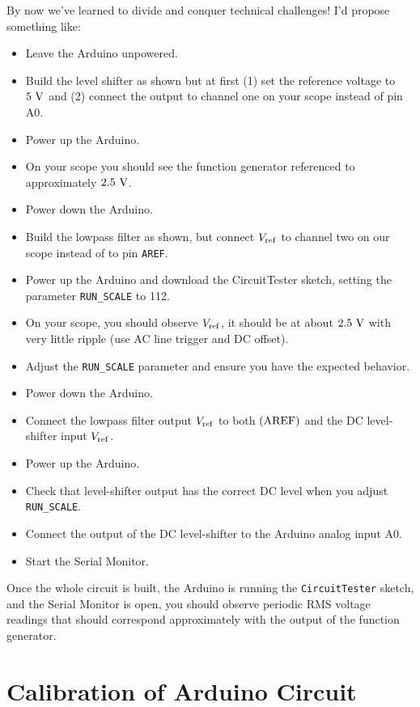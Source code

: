 \documentclass[12pt]{article}
\begin{document}
By now we've learned to divide and conquer technical challenges!  I'd propose something like:
\begin{itemize}
\item Leave the Arduino unpowered.
\item Build the level shifter as shown but at first (1) set the reference voltage to $5~\rm V$ and (2) connect the output to channel one on your scope instead of pin A0.
\item Power up the Arduino.
\item On your scope you should see the function generator referenced to approximately $2.5~\rm V$.
\item Power down the Arduino.
\item Build the lowpass filter as shown, but  connect $V_{\rm ref}$ to channel two on our scope instead of to pin {\tt AREF}.
\item Power up the Arduino and download the {\rm CircuitTester} sketch, setting the parameter {\tt RUN\_SCALE} to 112.
\item On your scope, you should observe $V_{\rm ref}$, it should be at about $2.5~\rm V$ with very little ripple (use AC line trigger and DC offset).
\item Adjust the {\tt RUN\_SCALE} parameter and ensure you have the expected behavior.
\item Power down the Arduino.
\item Connect the lowpass filter output $V_{\rm ref}$ to both $({\rm AREF})$ and the DC level-shifter input $V_{\rm ref}$.
\item Power up the Arduino.
\item Check that level-shifter output has the correct DC level when you adjust {\tt RUN\_SCALE}.
\item Connect the output of the DC level-shifter to the Arduino analog input A0.
\item Start the Serial Monitor.
\end{itemize}

Once the whole circuit is built, the Arduino is running the {\tt CircuitTester} sketch, and the Serial Monitor is open, you should observe periodic RMS voltage readings that should correspond approximately with the output of the function generator.

\section{Calibration of Arduino Circuit}
\end{document}
